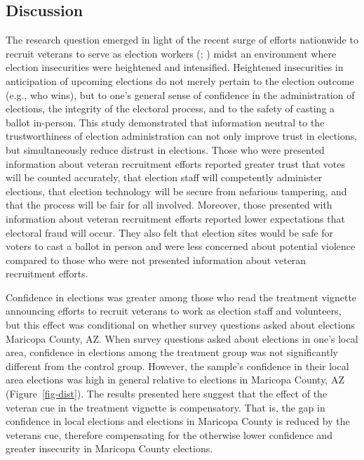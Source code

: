 \documentclass[
  12pt,
  letterpaper,
]{article}
\begin{document}
\subsection{Discussion}\label{discussion}

The research question emerged in light of the recent surge of efforts
nationwide to recruit veterans to serve as election workers
(;
) midst an environment where
election insecurities were heightened and intensified. Heightened
insecurities in anticipation of upcoming elections do not merely pertain
to the election outcome (e.g., who wins), but to one's general sense of
confidence in the administration of elections, the integrity of the
electoral process, and to the safety of casting a ballot in-person. This
study demonstrated that information neutral to the trustworthiness of
election administration can not only improve trust in elections, but
simultaneously reduce distrust in elections. Those who were presented
information about veteran recruitment efforts reported greater trust
that votes will be counted accurately, that election staff will
competently administer elections, that election technology will be
secure from nefarious tampering, and that the process will be fair for
all involved. Moreover, those presented with information about veteran
recruitment efforts reported lower expectations that electoral fraud
will occur. They also felt that election sites would be safe for voters
to cast a ballot in person and were less concerned about potential
violence compared to those who were not presented information about
veteran recruitment efforts.

Confidence in elections was greater among those who read the treatment
vignette announcing efforts to recruit veterans to work as election
staff and volunteers, but this effect was conditional on whether survey
questions asked about elections Maricopa County, AZ. When survey
questions asked about elections in one's local area, confidence in
elections among the treatment group was not significantly different from
the control group. However, the sample's confidence in their local area
elections was high in general relative to elections in Maricopa County,
AZ (Figure~\ref{fig-dist}). The results presented here suggest that the
effect of the veteran cue in the treatment vignette is compensatory.
That is, the gap in confidence in local elections and elections in
Maricopa County is reduced by the veterans cue, therefore compensating
for the otherwise lower confidence and greater insecurity in Maricopa
County elections.
\end{document}

